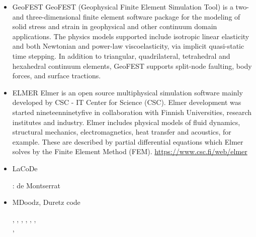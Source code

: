 \begin{itemize}
\item {\codefont GeoFEST} 
GeoFEST (Geophysical Finite Element Simulation Tool) is a two- and three-dimensional finite
element software package for the modeling of solid stress and strain in geophysical and 
other continuum domain applications.
The physics models supported include isotropic linear elasticity and both Newtonian and power-law
viscoelasticity, via implicit quasi-static time stepping. In addition to triangular, 
quadrilateral, tetrahedral and hexahedral continuum elements, GeoFEST supports split-node 
faulting, body forces, and surface tractions.


{\small
\noindent
\cite{paln08}
}

\item {\codefont ELMER} 
Elmer is an open source multiphysical simulation software mainly developed by 
CSC - IT Center for Science (CSC). Elmer development was started nineteenninetyfive in collaboration with 
Finnish Universities, research institutes and industry. Elmer includes physical models of 
fluid dynamics, structural mechanics, electromagnetics, heat transfer and acoustics, 
for example. These are described by partial differential equations which Elmer solves 
by the Finite Element Method (FEM). \url{https://www.csc.fi/web/elmer}

\cite{maierova}
\cite{mals14}

\item {\codefont LaCoDe}  

\begin{scriptsize}
\noindent
\twothousandnineteen: de Montserrat \etal \cite{demh19}
\end{scriptsize}

\item {\codefont MDoodz}, Duretz code

\begin{scriptsize}
\twothousandtwelve
\textcite{yatd12}
\twothousandthirteen
\textcite{yahb13}
\twothousandfifteen
\textcite{yadm15}
\twothousandsixteen
\textcite{dumy16}, \textcite{dupm16}
\twothousandnineteen
\textcite{chmd19}, \textcite{dual19}, \textcite{pedm19}
\twothousandtwenty
\textcite{poyd20}, \textcite{bedh20}, \textcite{chsm20}, \textcite{auwy20}\\
\twothousandtwentyone \textcite{pody21}, \textcite{cadm21}
\textcite{auwy21}
\end{scriptsize}


\end{itemize}
